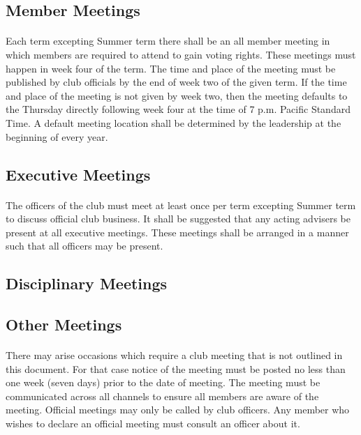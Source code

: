 \documentclass[12pt]{article}
\begin{document}
\subsection{Member Meetings}
\paragraph{}
Each term excepting Summer term there shall be an all member meeting in which members are required to attend to gain voting rights. 
These meetings must happen in week four of the term. 
The time and place of the meeting must be published by club officials by the end of week two of the given term. 
If the time and place of the meeting is not given by week two, then the meeting defaults to the Thursday directly following week four at the time of 7 p.m. Pacific Standard Time. A default meeting location shall be determined by the leadership at the beginning of every year.

\subsection{Executive Meetings}
\paragraph{}
The officers of the club must meet at least once per term excepting Summer term to discuss official club business.
It shall be suggested that any acting advisers be present at all executive meetings. 
These meetings shall be arranged in a manner such that all officers may be present.

\subsection{Disciplinary Meetings}
\paragraph{}


\subsection{Other Meetings}
\paragraph{}
There may arise occasions which require a club meeting that is not outlined in this document. For that case notice of the meeting must be posted no less than one week (seven days) prior to the date of meeting. The meeting must be communicated across all channels to ensure all members are aware of the meeting. Official meetings may only be called by club officers. Any member who wishes to declare an official meeting must consult an officer about it.
\end{document}
